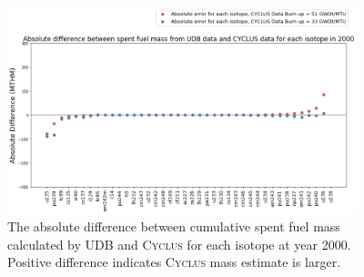 \begin{frame}
    \frametitle{}
    \begin{figure}[htbp!]
        \begin{center}
          \includegraphics[height=6cm]{../figures/absolute_diff_2000}
        \end{center}
              \caption{The absolute difference between cumulative spent fuel mass calculated by 
              UDB and \textsc{Cyclus} for each isotope at year 2000. Positive difference indicates \textsc{Cyclus}
              mass estimate is larger.}
        \label{fig:totalmass}
      \end{figure}
\end{frame}